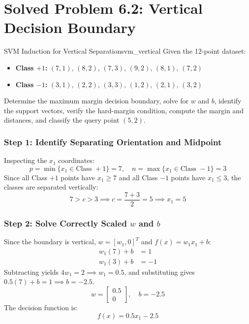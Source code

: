 \section{Solved Problem 6.2: Vertical Decision Boundary}

\begin{example}{SVM Induction for Vertical Separation}{svm_vertical}
Given the 12-point dataset:
\begin{itemize}
    \item \textbf{Class $+1$:} $(7, 1),\, (8, 2),\, (7, 3),\, (9, 2),\, (8, 1),\, (7, 2)$
    \item \textbf{Class $-1$:} $(3, 1),\, (2, 2),\, (3, 3),\, (1, 2),\, (2, 1),\, (3, 2)$
\end{itemize}
Determine the maximum margin decision boundary, solve for $w$ and $b$, identify the support vectors, verify the hard-margin condition, compute the margin and distances, and classify the query point $(5, 2)$.

\subsubsection{Step 1: Identify Separating Orientation and Midpoint}
Inspecting the $x_1$ coordinates:
\begin{equation}
p = \min\{x_1 \in \text{Class } +1\} = 7, \quad n = \max\{x_1 \in \text{Class } -1\} = 3
\end{equation}
Since all Class $+1$ points have $x_1 \ge 7$ and all Class $-1$ points have $x_1 \le 3$, the classes are separated vertically:
\begin{equation}
7 > c > 3 \implies c = \frac{7 + 3}{2} = 5 \implies x_1 = 5
\end{equation}

\subsubsection{Step 2: Solve Correctly Scaled \texorpdfstring{$w$}{w} and \texorpdfstring{$b$}{b}}
Since the boundary is vertical, $w = [w_1, 0]^T$ and $f(x) = w_1 x_1 + b$:
\begin{align}
w_1(7) + b &= 1 \\
w_1(3) + b &= -1
\end{align}
Subtracting yields $4 w_1 = 2 \implies w_1 = 0.5$, and substituting gives $0.5(7) + b = 1 \implies b = -2.5$.
\begin{equation}
w = \begin{bmatrix} 0.5 \\ 0 \end{bmatrix}, \quad b = -2.5
\end{equation}
The decision function is:
\begin{equation}
f(x) = 0.5 x_1 - 2.5
\end{equation}


\end{example}
